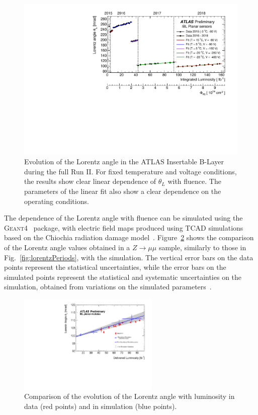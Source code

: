 \begin{figure}[H]
\includegraphics[width=\textwidth]{figures/SensorSimulation/pix-2019/fig_07.pdf}
\caption{Evolution of the Lorentz angle in the ATLAS Insertable B-Layer during the full Run II. For fixed temperature and voltage conditions, the results show clear linear dependence of $\theta_L$ with fluence. The parameters of the linear fit also show a clear dependence on the operating conditions.}
\label{fig:lorentzRun2}
\end{figure}
\noindent
The dependence of the Lorentz angle with fluence can be simulated using the \textsc{Geant4}~\cite{bib:geant} package, with electric field maps produced using TCAD simulations~\cite{bib:tcad} based on the Chiochia radiation damage model~\cite{bib:chiochia}. Figure~\ref{fig:chiochia} shows the comparison of the Lorentz angle values obtained in a $Z\to\mu\mu$ sample, similarly to those in Fig.~\ref{fig:lorentzPeriods}, with the simulation. The vertical error bars on the data points represent the statistical uncertainties, while the error bars on the simulated points represent the statistical and systematic uncertainties on the simulation, obtained from variations on the simulated parameters~\cite{bib:llorente2}. 
\begin{figure}[H]
\centering
\includegraphics[width=0.6\textwidth,height=0.45\textwidth]{figures/SensorSimulation/simulation.pdf}
\caption{Comparison of the evolution of the Lorentz angle with luminosity in data (red points) and in simulation (blue points).}
\label{fig:chiochia}
\end{figure}
